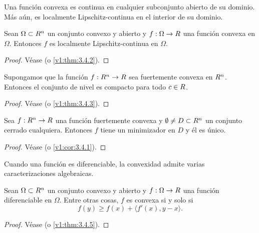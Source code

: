 Una función convexa es continua en cualquier subconjunto abierto de su dominio. Más aún, es localmente Lipschitz-continua en el interior de su dominio.

\begin{theorem}\label{v2:thm:1.3.3}
    Sean $\Omega \subset R^n$ un conjunto convexo y abierto y $f : \Omega \to R$ una función convexa en $\Omega$. Entonces $f$ es localmente Lipschitz-continua en $\Omega$.
\end{theorem}

\begin{proof}
    Véase \cite{izmailov2020otimizacaovolume1} (o \cref{v1:thm:3.4.2}).
\end{proof}

\begin{theorem}\label{v2:thm:1.3.4}
    Supongamos que la función $f : R^n \to R$ sea fuertemente convexa en $R^n$. Entonces el conjunto de nivel es compacto para todo $c \in R$.
\end{theorem}

\begin{proof}
    Véase \cite{izmailov2020otimizacaovolume1} (o \cref{v1:thm:3.4.3}).
\end{proof}

\begin{corollary}\label{v2:cor:1.3.1}
    Sea $f : R^n \to R$ una función fuertemente convexa y $\emptyset \neq D \subset R^n$ un conjunto cerrado cualquiera. Entonces $f$ tiene un minimizador en $D$ y él es único.
\end{corollary}

\begin{proof}
    Véase \cite{izmailov2020otimizacaovolume1} (o \cref{v1:cor:3.4.1}).
\end{proof}

Cuando una función es diferenciable, la convexidad admite varias caracterizaciones algebraicas.

\begin{theorem}\label{v2:thm:1.3.5}
    Sean $\Omega \subset R^n$ un conjunto convexo y abierto y $f : \Omega \to R$ una función diferenciable en $\Omega$. Entre otras cosas, $f$ es convexa si y solo si
    \[
        f(y) \ge f(x) + \langle f'(x), y - x \rangle.
    \]
\end{theorem}

\begin{proof}
    Véase \cite{izmailov2020otimizacaovolume1} (o \cref{v1:thm:3.4.5}).
\end{proof}

